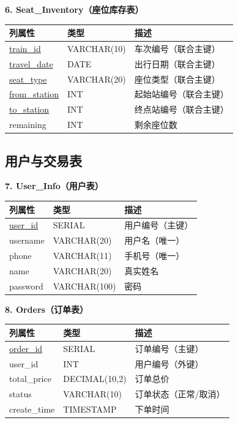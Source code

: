 \documentclass[10pt,a4paper]{article}
\begin{document}
\textbf{6. Seat\_Inventory（座位库存表）}
\begin{table}[H]
    \centering
    \begin{tabular}{lll}
        \toprule
        \textbf{列属性} & \textbf{类型} & \textbf{描述} \\
        \midrule
        \underline{train\_id} & VARCHAR(10) & 车次编号（联合主键） \\
        \underline{travel\_date} & DATE & 出行日期（联合主键） \\
        \underline{seat\_type} & VARCHAR(20) & 座位类型（联合主键） \\
        \underline{from\_station} & INT & 起始站编号（联合主键） \\
        \underline{to\_station} & INT & 终点站编号（联合主键） \\
        remaining & INT & 剩余座位数 \\
        \bottomrule
    \end{tabular}
\end{table}

\subsection{用户与交易表}

\textbf{7. User\_Info（用户表）}
\begin{table}[H]
    \centering
    \begin{tabular}{lll}
        \toprule
        \textbf{列属性} & \textbf{类型} & \textbf{描述} \\
        \midrule
        \underline{user\_id} & SERIAL & 用户编号（主键） \\
        username & VARCHAR(20) & 用户名（唯一） \\
        phone & VARCHAR(11) & 手机号（唯一） \\
        name & VARCHAR(20) & 真实姓名 \\
        password & VARCHAR(100) & 密码 \\
        \bottomrule
    \end{tabular}
\end{table}

\textbf{8. Orders（订单表）}
\begin{table}[H]
    \centering
    \begin{tabular}{lll}
        \toprule
        \textbf{列属性} & \textbf{类型} & \textbf{描述} \\
        \midrule
        \underline{order\_id} & SERIAL & 订单编号（主键） \\
        user\_id & INT & 用户编号（外键） \\
        total\_price & DECIMAL(10,2) & 订单总价 \\
        status & VARCHAR(10) & 订单状态（正常/取消） \\
        create\_time & TIMESTAMP & 下单时间 \\
        \bottomrule
    \end{tabular}
\end{table}
\end{document}
